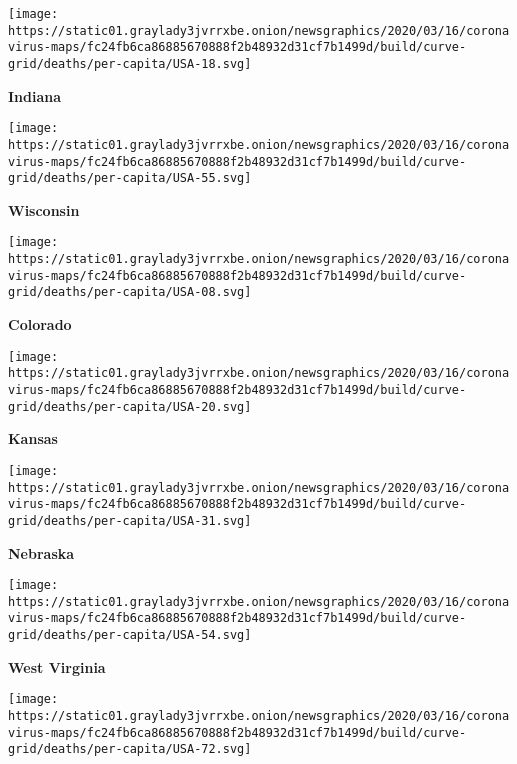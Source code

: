 \texttt{[image: https://static01.graylady3jvrrxbe.onion/newsgraphics/2020/03/16/coronavirus-maps/fc24fb6ca86885670888f2b48932d31cf7b1499d/build/curve-grid/deaths/per-capita/USA-18.svg]}

\textbf{Indiana}

\href{https://www.nytimes3xbfgragh.onion/interactive/2020/us/wisconsin-coronavirus-cases.html}{}

\texttt{[image: https://static01.graylady3jvrrxbe.onion/newsgraphics/2020/03/16/coronavirus-maps/fc24fb6ca86885670888f2b48932d31cf7b1499d/build/curve-grid/deaths/per-capita/USA-55.svg]}

\textbf{Wisconsin}

\href{https://www.nytimes3xbfgragh.onion/interactive/2020/us/colorado-coronavirus-cases.html}{}

\texttt{[image: https://static01.graylady3jvrrxbe.onion/newsgraphics/2020/03/16/coronavirus-maps/fc24fb6ca86885670888f2b48932d31cf7b1499d/build/curve-grid/deaths/per-capita/USA-08.svg]}

\textbf{Colorado}

\href{https://www.nytimes3xbfgragh.onion/interactive/2020/us/kansas-coronavirus-cases.html}{}

\texttt{[image: https://static01.graylady3jvrrxbe.onion/newsgraphics/2020/03/16/coronavirus-maps/fc24fb6ca86885670888f2b48932d31cf7b1499d/build/curve-grid/deaths/per-capita/USA-20.svg]}

\textbf{Kansas}

\href{https://www.nytimes3xbfgragh.onion/interactive/2020/us/nebraska-coronavirus-cases.html}{}

\texttt{[image: https://static01.graylady3jvrrxbe.onion/newsgraphics/2020/03/16/coronavirus-maps/fc24fb6ca86885670888f2b48932d31cf7b1499d/build/curve-grid/deaths/per-capita/USA-31.svg]}

\textbf{Nebraska}

\href{https://www.nytimes3xbfgragh.onion/interactive/2020/us/west-virginia-coronavirus-cases.html}{}

\texttt{[image: https://static01.graylady3jvrrxbe.onion/newsgraphics/2020/03/16/coronavirus-maps/fc24fb6ca86885670888f2b48932d31cf7b1499d/build/curve-grid/deaths/per-capita/USA-54.svg]}

\textbf{West Virginia}

\href{https://www.nytimes3xbfgragh.onion/interactive/2020/us/puerto-rico-coronavirus-cases.html}{}

\texttt{[image: https://static01.graylady3jvrrxbe.onion/newsgraphics/2020/03/16/coronavirus-maps/fc24fb6ca86885670888f2b48932d31cf7b1499d/build/curve-grid/deaths/per-capita/USA-72.svg]}

